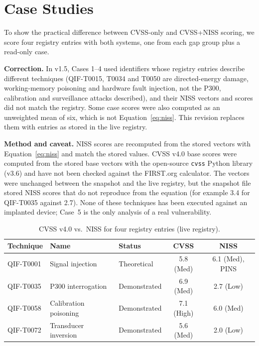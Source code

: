 
\section{Case Studies}
\label{sec:case-studies}

To show the practical difference between CVSS-only and CVSS+NISS scoring, we score four
registry entries with both systems, one from each gap group plus a read-only case.

\textbf{Correction.} In v1.5, Cases 1--4 used identifiers whose registry entries describe
different techniques (QIF-T0015, T0034 and T0050 are directed-energy damage, working-memory
poisoning and hardware fault injection, not the P300, calibration and surveillance attacks
described), and their NISS vectors and scores did not match the registry. Some case scores
were also computed as an unweighted mean of six, which is not Equation~\ref{eq:niss}. This
revision replaces them with entries as stored in the live registry.

\textbf{Method and caveat.} NISS scores are recomputed from the stored vectors with
Equation~\ref{eq:niss} and match the stored values. CVSS v4.0 base scores were computed
from the stored base vectors with the open-source \texttt{cvss} Python library (v3.6) and
have not been checked against the FIRST.org calculator. The vectors were unchanged between
the snapshot and the live registry, but the snapshot file stored NISS scores that do not
reproduce from the equation (for example 3.4 for QIF-T0035 against 2.7). None of these
techniques has been executed against an implanted device; Case~5 is the only analysis of a
real vulnerability.

\begin{table}[H]
\centering
\caption{CVSS v4.0 vs.\ NISS for four registry entries (live registry).}
\label{tab:case-studies}
\small
\begin{tabularx}{\textwidth}{@{}l X l c c@{}}
\toprule
\textbf{Technique} & \textbf{Name} & \textbf{Status} & \textbf{CVSS} & \textbf{NISS} \\
\midrule
QIF-T0001 & Signal injection       & Theoretical  & 5.8 (Med)  & 6.1 (Med), PINS \\
QIF-T0035 & P300 interrogation     & Demonstrated & 6.9 (Med)  & 2.7 (Low) \\
QIF-T0058 & Calibration poisoning  & Demonstrated & 7.1 (High) & 6.0 (Med) \\
QIF-T0072 & Transducer inversion   & Demonstrated & 5.6 (Med)  & 2.0 (Low) \\
\bottomrule
\end{tabularx}
\end{table}

